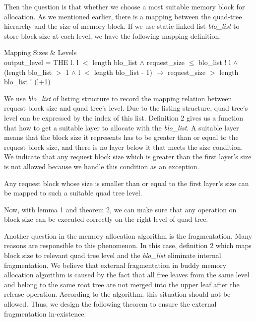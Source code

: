 \documentclass[runningheads]{llncs}
\begin{document}
Then the question is that whether we choose a most suitable memory block for allocation. As we mentioned earlier, there is a mapping between the quad-tree hierarchy and the size of memory block. If we use static linked list \textsl{blo\_list} to store block size at each level, we have the following mapping definition:

\begin{definition} {Mapping Sizes $\&$ Levels} \\
output\_level = THE l. l $<$ length blo\_list $\wedge$ request\_size $\le$ blo\_list ! l $\wedge$ (length blo\_list $>$ 1 $\wedge$ l $<$ length blo\_list - 1) $\longrightarrow$ request\_size $>$ length blo\_list ! (l+1)
\end{definition}

We use \textsl{blo\_list} of listing structure to record the mapping relation between request block size and quad tree's level. Due to the listing structure, quad tree's level can be expressed by the index of this list. Definition 2 gives us a function that how to get a suitable layer to allocate with the \textsl{blo\_list}. A suitable layer means that the block size it represents has to be greater than or equal to the request block size, and there is no layer below it that meets the size condition. We indicate that any request block size which is greater than the first layer's size is not allowed because we handle this condition as an exception.

\begin{theorem}
Any request block whose size is smaller than or equal to the first layer's size can be mapped to such a suitable quad tree level.
\end{theorem}

Now, with lemma 1 and theorem 2, we can make sure that any operation on block size can be executed correctly on the right level of quad tree.

Another question in the memory allocation algorithm is the fragmentation. Many reasons are responsible to this phenomenon. In this case, definition 2 which maps block size to relevant quad tree level and the \textsl{blo\_list} eliminate internal fragmentation. We believe that external fragmentation in buddy memory allocation algorithm is caused by the fact that all free leaves from the same level and belong to the same root tree are not merged into the upper leaf after the release operation. According to the algorithm, this situation should not be allowed. Thus, we design the following theorem to ensure the external fragmentation in-existence.
\end{document}
